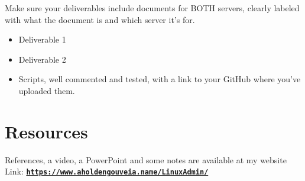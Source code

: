 \documentclass[12pt]{article}
\begin{document}
Make sure your deliverables include documents for BOTH servers, clearly labeled with what the document is and which server it's for.
\begin{itemize}
    \item Deliverable 1
    \item Deliverable 2
    \item Scripts, well commented and tested, with a link to your GitHub where you've uploaded them.
\end{itemize}

\section*{Resources}
References, a video, a PowerPoint and some notes are available at my website
Link: \href{https://www.aholdengouveia.name/LinuxAdmin/}{\textbf{\nolinkurl{https://www.aholdengouveia.name/LinuxAdmin/}}}

\end{document}
